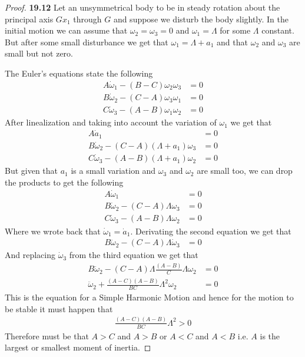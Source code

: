 \documentclass[11pt]{article}
\theoremstyle{definition}
\begin{document}
\begin{proof}{\textbf{19.12}}
    Let an unsymmetrical body to be in steady rotation about the principal
    axis $Gx_1$ through $G$ and suppose we disturb the body slightly.
    In the initial motion we can assume that $\omega_2 = \omega_3 = 0$
    and $\omega_1 = \Lambda$ for some $\Lambda$ constant.
    But after some small disturbance we get that  
    $\omega_1 = \Lambda + a_1$ and that $\omega_2$ and $\omega_3$ are small
    but not zero.
 
    The Euler's equations state the following
    \begin{align*}
        A\dot\omega_1 - (B - C)\omega_2\omega_3 &= 0\\
        B\dot\omega_2 - (C - A)\omega_3\omega_1 &= 0\\
        C\dot\omega_3 - (A - B)\omega_1\omega_2 &= 0
    \end{align*}
    After linealization and taking into account the variation of 
    $\omega_1$ we get that
    \begin{align*}
        A\dot{a}_1 &= 0\\
        B\dot\omega_2 - (C - A)(\Lambda + a_1)\omega_3 &= 0\\
        C\dot\omega_3 - (A - B)(\Lambda + a_1)\omega_2 &= 0
    \end{align*}
    But given that $a_1$ is a small variation and $\omega_3$ and $\omega_2$
    are small too, we can drop the products to get the following
    \begin{align*}
        A\dot{\omega}_1 &= 0\\
        B\dot\omega_2 - (C - A)\Lambda\omega_3 &= 0\\
        C\dot\omega_3 - (A - B)\Lambda\omega_2 &= 0
    \end{align*}
    Where we wrote back that $\dot\omega_1 = \dot a_1$. Derivating the second
    equation we get that
    \begin{align*}
        B\ddot\omega_2 - (C - A)\Lambda\dot\omega_3 &= 0
    \end{align*}
    And replacing $\dot\omega_3$ from the third equation we get that 
    \begin{align*}
        B\ddot\omega_2 - (C - A)\Lambda\frac{(A - B)}{C}\Lambda\omega_2 &= 0\\
        \ddot\omega_2 + \frac{(A - C)(A - B)}{BC}\Lambda^2\omega_2 &= 0
    \end{align*}
    This is the equation for a Simple Harmonic Motion and hence for the motion
    to be stable it must happen that
    \begin{align*}
        \frac{(A - C)(A - B)}{BC}\Lambda^2 > 0
    \end{align*} 
    Therefore must be that $A > C$ and $A > B$ or $A < C$ and $A < B$ i.e.
    $A$ is the largest or smallest moment of inertia.


\end{proof}
\end{document}
